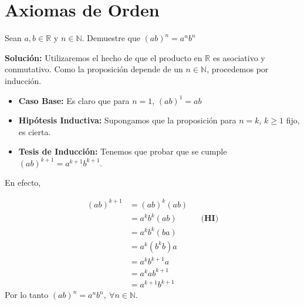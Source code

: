 \documentclass[12pt]{book}
\begin{document}
\chapter{Axiomas de Orden}

\begin{prob}{}{}
   Sean $a,b \in \mathbb{R}$ y $n \in \mathbb{N}$. Demuestre que $(ab)^n=a^nb^n$
\end{prob}
\textbf{Solución:}
Utilizaremos el hecho de que el producto en $\mathbb{R}$ es asociativo y conmutativo. Como la proposición depende de un $n \in \mathbb{N}$, procedemos por inducción.

\begin{itemize}
    \item \textbf{Caso Base:} Es claro que para $n=1$, $(ab)^1=ab$

    \item \textbf{\textbf{Hipótesis Inductiva:}} Supongamos que la proposición para $n=k$, $k\geq 1$ fijo, es cierta.

    \item \textbf{Tesis de Inducción:} Tenemos que probar que se cumple $(ab)^{k+1} = a^{k+1} b^{k+1}$.
\end{itemize}
En efecto,

\begin{align*}
    (ab)^{k+1}&=(ab)^k(ab) \\
    &=a^{k}b^{k}(ab) && \textbf{(HI)} \\
    &=a^{k}b^{k}(ba) \\
    &=a^{k}(b^{k}b)a \\
    &=a^{k}b^{k+1}a \\
    &=a^kab^{k+1} \\
    &=a^{k+1}b^{k+1}
\end{align*}
Por lo tanto $(ab)^n=a^nb^n, \ \forall n \in \mathbb{N}$.
\end{document}
